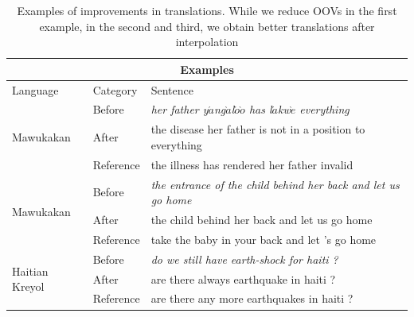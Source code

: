 \documentclass[11pt]{article}
\begin{document}
	\begin{table}
    \centering
    {\footnotesize
	\begin{tabular}{|l|l|l|}
		\toprule
		\multicolumn{3}{|c|}{Examples} \\
		\toprule
		Language & Category & Sentence \\
		\toprule
		\multirow{3}{*}{Mawukakan} & Before & \emph{her father y$\acute{a}$ng$\grave{a}$l$\acute{o}$$\grave{o}$ has l$\acute{a}$kw$\grave{e}$ everything} \\ & After & the disease her father is not in a position to everything \\ &  Reference & the illness has rendered her father invalid \\
		\midrule
		\multirow{3}{*}{Mawukakan} & Before & \emph{the entrance of the child behind her back and let us go home} \\ & After & the child behind her back and let us go home \\ & Reference & take the baby in your back and let 's go home \\ 
		\midrule
		\multirow{3}{*}{Haitian Kreyol} & Before & \emph{do we still have earth-shock for haiti ?} \\ & After & are there always earthquake in haiti ? \\ & Reference &  are there any more earthquakes in haiti ?\\
		\bottomrule
	\end{tabular}
    }
	\caption{Examples of improvements in translations. While we reduce OOVs in the first example, in the second and third, we obtain better translations after interpolation}	
	\label{table:example_translations}
	\end{table}

	\begin{comment}
	\begin{table}
		\small
		\centering
		
		\caption{Examples of improvements in translations}
		\label{table:examples}
	\end{table}
	

	In the Table~\ref{table:examples}, we report examples of improvements in translations. In the first example, we observe that two words that were OOVs for our baseline model have translations after triangulation \& interpolation. In the second and third examples, we observe that triangulation leads to better translations. ``The entrance of the child'' is the only translation for the source phrase \emph{$l\acute{a}$} while after triangulation, we have several translations. In case of ``tranblemannt\`e'', our baseline model has several English translations but none of them mention ``earthquake''. They lead to shaking, tension, of the earthquake, but not the word ``earthquake''. 
	\end{comment}
\end{document}
